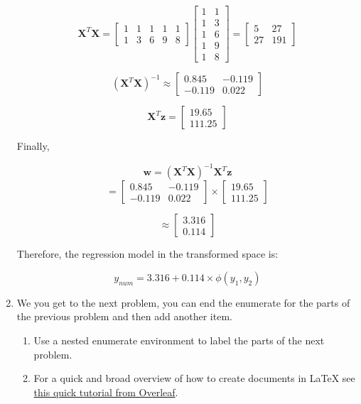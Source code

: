 \documentclass{article}
\begin{document}
\begin{enumerate}[leftmargin=\labelsep]
\[
\mathbf{X}^T \mathbf{X} = 
\begin{bmatrix}
1 & 1 & 1 & 1 & 1 \\
1 & 3 & 6 & 9 & 8
\end{bmatrix}
\begin{bmatrix}
1 & 1 \\
1 & 3 \\
1 & 6 \\
1 & 9 \\
1 & 8
\end{bmatrix}
=
\begin{bmatrix}
5 & 27 \\
27 & 191
\end{bmatrix}
\]

\[(\mathbf{X}^T \mathbf{X})^{-1} \approx \begin{bmatrix}
0.845 & -0.119 \\
-0.119 & 0.022
\end{bmatrix}\]

\[\mathbf{X}^T \mathbf{z} = \begin{bmatrix}
19.65 \\
111.25
\end{bmatrix}\]

Finally,

\[\boldsymbol{w} = (\mathbf{X}^T \mathbf{X})^{-1} \mathbf{X}^T \mathbf{z}\]
\[= \begin{bmatrix}
0.845 & -0.119 \\
-0.119 & 0.022
\end{bmatrix} \times \begin{bmatrix}
19.65 \\
111.25
\end{bmatrix}\]

\[\approx \begin{bmatrix}
3.316\\
0.114
\end{bmatrix}\]

Therefore, the regression model in the transformed space is:

\[y_{num} = 3.316 + 0.114 \times \phi(y_1, y_2)\]

\item We you get to the next problem, you can end the enumerate for the parts of the previous problem and then add another item.
    \begin{enumerate}
    \item Use a nested enumerate environment to label the parts of the next problem.
    \item For a quick and broad overview of how to create documents in {\LaTeX} see 
    \href{https://www.overleaf.com/learn/latex/Learn_LaTeX_in_30_minutes}{this quick tutorial from Overleaf}.
    \end{enumerate}
\end{enumerate}
\end{document}

